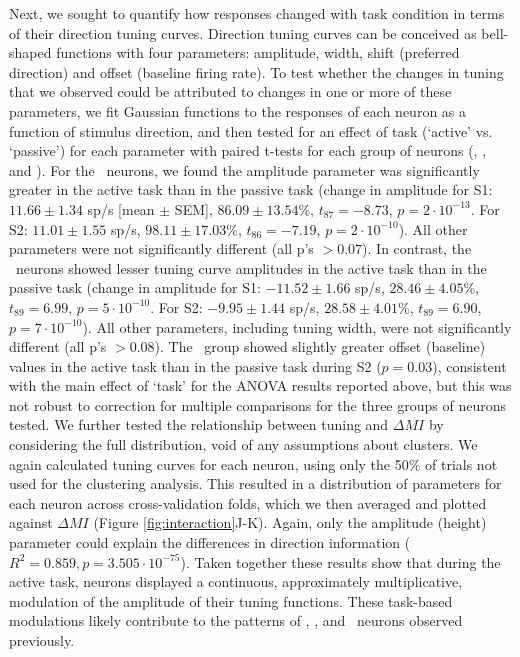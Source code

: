 Next, we sought to quantify how responses changed with task condition in terms of their direction tuning curves.
Direction tuning curves can be conceived as bell-shaped functions with four parameters: amplitude, width, shift (preferred direction) and offset (baseline firing rate).
To test whether the changes in tuning that we observed could be attributed to changes in one or more of these parameters, we fit Gaussian functions to the responses of each neuron as a function of stimulus direction, and then tested for an effect of task (`active' vs. `passive') for each parameter with paired t-tests for each group of neurons (\enhanced, \suppressed, and \consistent). 
For the \enhanced\ neurons, we found the amplitude parameter was significantly greater in the active task than in the passive task (change in amplitude for S1: $11.66 \pm 1.34$ sp/s [mean $\pm$ SEM], $86.09 \pm 13.54$\%, $t_{87} = -8.73$, $p = 2 \cdot 10^{-13}$. For S2: $11.01 \pm 1.55$ sp/s, $98.11 \pm 17.03$\%, $t_{86} = -7.19$, $p = 2 \cdot 10^{-10}$). 
All other parameters were not significantly different (all p's $> 0.07$).
In contrast, the \suppressed\ neurons showed lesser tuning curve amplitudes in the active task than in the passive task (change in amplitude for S1: $-11.52 \pm 1.66$ sp/s, $28.46 \pm 4.05$\%, $t_{89} = 6.99$, $p = 5 \cdot 10^{-10}$. For S2: $-9.95 \pm 1.44$ sp/s, $28.58 \pm 4.01$\%, $t_{89} = 6.90$, $p = 7 \cdot 10^{-10}$). 
All other parameters, including tuning width, were not significantly different (all p's $> 0.08$).
The \consistent\ group showed slightly greater offset (baseline) values in the active task than in the passive task during S2 ($p = 0.03$), consistent with the main effect of `task' for the ANOVA results reported above, but this was not robust to correction for multiple comparisons for the three groups of neurons tested. 
\newcommand{\revTuningScatterResult}{
	We further tested the relationship between tuning and $\Delta MI$ by considering the full distribution, void of any assumptions about clusters. We again calculated tuning curves for each neuron, using only the 50\% of trials not used for the clustering analysis. This resulted in a distribution of parameters for each neuron across cross-validation folds, which we then averaged and plotted against $\Delta MI$ (Figure \ref{fig:interaction}J-K). Again, only the amplitude (height) parameter could explain the differences in direction information ($R^2=0.859, p=3.505 \cdot 10^{-75}$). 
}\revTuningScatterResult\label{rev:tuneScatterResult}
Taken together these results show that during the active task, neurons displayed a continuous, approximately multiplicative, modulation of the amplitude of their tuning functions. These task-based modulations likely contribute to the patterns of \enhanced, \suppressed, and \consistent\ neurons observed previously.

